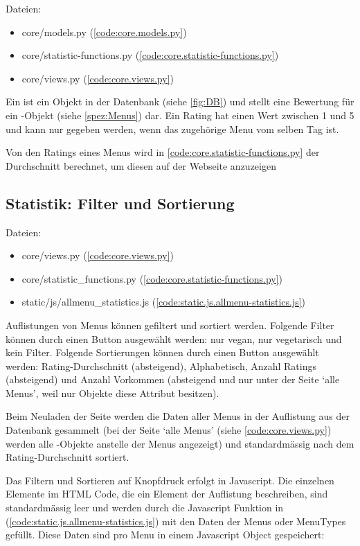 Dateien:
\begin{itemize}
    \item core/models.py (\ref{code:core.models.py})
    \item core/statistic-functions.py (\ref{code:core.statistic-functions.py})
    \item core/views.py (\ref{code:core.views.py})
\end{itemize}

Ein  ist ein Objekt in der Datenbank (siehe \ref{fig:DB}) und stellt
eine Bewertung für ein -Objekt (siehe \ref{spez:Menus}) dar. Ein
Rating hat einen Wert zwischen 1 und 5 und kann nur gegeben werden, wenn das
zugehörige Menu vom selben Tag ist.

Von den Ratings eines Menus wird in 
\ref{code:core.statistic-functions.py} der Durchschnitt berechnet, um diesen auf
der Webseite anzuzeigen


\subsection{Statistik: Filter und Sortierung} \label{spez:Statistik}

Dateien:
\begin{itemize}
    \item core/views.py (\ref{code:core.views.py})
    \item core/statistic\_functions.py (\ref{code:core.statistic-functions.py})
    \item static/js/allmenu\_statistics.js (\ref{code:static.js.allmenu-statistics.js})
\end{itemize}

Auflistungen von Menus können gefiltert und sortiert werden. Folgende Filter
können durch einen Button ausgewählt werden: nur vegan, nur vegetarisch und kein
Filter. Folgende Sortierungen können durch einen Button ausgewählt werden:
Rating-Durchschnitt (absteigend), Alphabetisch, Anzahl Ratings (absteigend) und Anzahl
Vorkommen (absteigend und nur unter der Seite `alle Menus', weil nur 
Objekte diese Attribut besitzen).

Beim Neuladen der Seite werden die Daten aller Menus in der Auflistung aus der
Datenbank gesammelt (bei der Seite `alle Menus' (siehe \ref{code:core.views.py})
werden alle -Objekte anstelle der Menus angezeigt) und
standardmässig nach dem Rating-Durchschnitt sortiert. 

Das Filtern und Sortieren auf Knopfdruck erfolgt in Javascript. Die einzelnen
 Elemente im HTML Code, die ein Element der Auflistung beschreiben,
sind standardmässig leer und werden durch die Javascript Funktion
 in 
(\ref{code:static.js.allmenu-statistics.js}) mit den Daten der Menus oder
MenuTypes gefüllt. Diese Daten sind pro Menu in einem Javascript Object
gespeichert:


